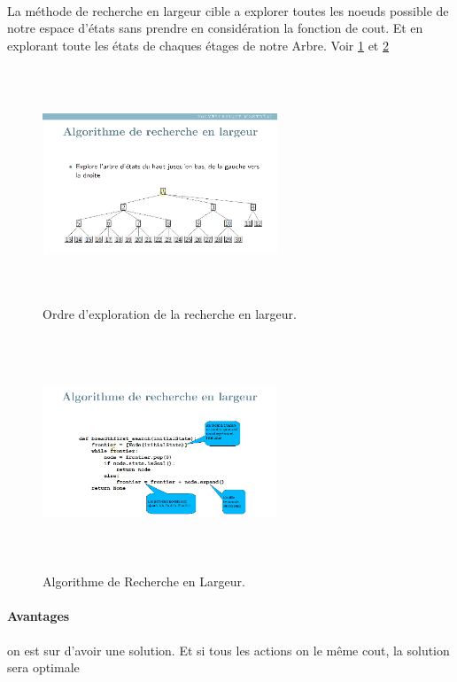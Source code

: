 \documentclass{book}
\begin{document}
\paragraph{}
La méthode de recherche en largeur cible a explorer toutes les noeuds possible de notre espace d'états sans prendre en considération la fonction de cout. Et en explorant toute les états de chaques étages de notre Arbre. Voir \ref{fig:Recherche_en_largeur} et \ref{fig:Algo_Recherche_en_largeur}

\begin{figure}[!ht]
\centering
\includegraphics[width = 7cm, height = 7cm, keepaspectratio]{Recherche_Largeur.png}
\caption{Ordre d'exploration de la recherche en largeur.}
\label{fig:Recherche_en_largeur}
\end{figure}

\begin{figure}[!ht]
\centering
\includegraphics[width = 7cm, height = 7cm, keepaspectratio]{algo_largeur.png}
\caption{Algorithme de Recherche en Largeur.}
\label{fig:Algo_Recherche_en_largeur}
\end{figure}
\paragraph{Avantages}
on est sur d'avoir une solution. Et si tous les actions on le même cout, la solution sera optimale
\end{document}
